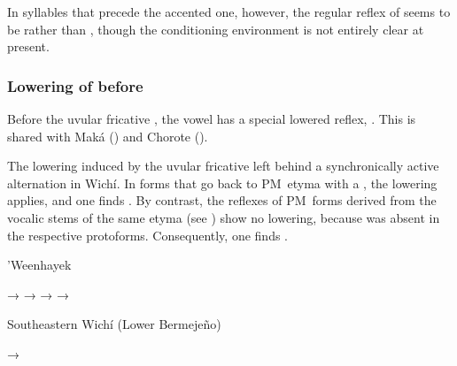 In syllables that precede the accented one, however, the regular reflex of  seems to be  rather than , though the conditioning environment is not entirely clear at present.

\begin{exe}
    \ex \deep
    \ex \duraznillo
    \ex \meat
\end{exe}

\subsubsection{Lowering of  before }\label{pm-wi-ejj-ajj}

Before the uvular fricative , the vowel  has a special lowered reflex, . This is shared with Maká () and Chorote ().

\begin{exe}
    \ex \fatv
    \ex \jabiru
    \ex \longv
    \ex \smoke
    \ex \fullriver
    \ex \blackalgarrobof
    \ex \peccary
    \ex \hurt
    \ex \chaguara
    \ex \wildbean
    \ex \mistolf
    \ex \puma
\end{exe}

The lowering induced by the uvular fricative left behind a synchronically active alternation in Wichí. In forms that go back to PM~etyma with a , the lowering applies, and one finds . By contrast, the reflexes of PM~forms derived from the vocalic stems of the same etyma (see ) show no lowering, because  was absent in the respective protoforms. Consequently, one finds .

\ea
   ’Weenhayek \citep[8, 92, 293,  297, 426]{KC16}
    \begin{xlist}
        \ex {} → 
        \ex {} → 
        \ex {} → 
        \ex {} → 
    \end{xlist}
\z

\ea
   Southeastern Wichí (Lower Bermejeño) \citep[210–211]{VN14}
    \begin{xlist}
        \ex {} → 
    \end{xlist}
\z
{}

